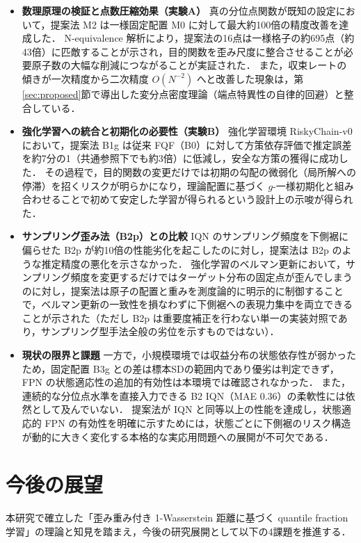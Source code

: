 \documentclass[a4paper,10pt]{jsarticle}
\theoremstyle{definition}
\begin{document}
\begin{itemize}
  \item \textbf{数理原理の検証と点数圧縮効果（実験A）}\quad
  真の分位点関数が既知の設定において，提案法 M2 は一様固定配置 M0 に対して最大約100倍の精度改善を達成した．
  N-equivalence 解析により，提案法の16点は一様格子の約695点（約43倍）に匹敵することが示され，目的関数を歪み尺度に整合させることが必要原子数の大幅な削減につながることが実証された．
  また，収束レートの傾きが一次精度から二次精度 $O(N^{-2})$ へと改善した現象は，第\ref{sec:proposed}節で導出した変分点密度理論（端点特異性の自律的回避）と整合している．

  \item \textbf{強化学習への統合と初期化の必要性（実験B）}\quad
  強化学習環境 RiskyChain-v0 において，提案法 B1g は従来 FQF（B0）に対して方策依存評価で推定誤差を約7分の1（共通参照下でも約3倍）に低減し，安全な方策の獲得に成功した．
  その過程で，目的関数の変更だけでは初期の勾配の微弱化（局所解への停滞）を招くリスクが明らかになり，理論配置に基づく $g$-一様初期化と組み合わせることで初めて安定した学習が得られるという設計上の示唆が得られた．

  \item \textbf{サンプリング歪み法（B2p）との比較}\quad
  IQN のサンプリング頻度を下側裾に偏らせた B2p が約10倍の性能劣化を起こしたのに対し，提案法は B2p のような推定精度の悪化を示さなかった．
  強化学習のベルマン更新において，サンプリング頻度を変更するだけではターゲット分布の固定点が歪んでしまうのに対し，提案法は原子の配置と重みを測度論的に明示的に制御することで，ベルマン更新の一致性を損なわずに下側裾への表現力集中を両立できることが示された（ただし B2p は重要度補正を行わない単一の実装対照であり，サンプリング型手法全般の劣位を示すものではない）．

  \item \textbf{現状の限界と課題}\quad
  一方で，小規模環境では収益分布の状態依存性が弱かったため，固定配置 B3g との差は標本SDの範囲内であり優劣は判定できず，FPN の状態適応性の追加的有効性は本環境では確認されなかった．
  また，連続的な分位点水準を直接入力できる B2 IQN（MAE 0.36）の柔軟性には依然として及んでいない．
  提案法が IQN と同等以上の性能を達成し，状態適応的 FPN の有効性を明確に示すためには，状態ごとに下側裾のリスク構造が動的に大きく変化する本格的な実応用問題への展開が不可欠である．
\end{itemize}

\section{今後の展望}
\label{sec:future}
本研究で確立した「歪み重み付き 1-Wasserstein 距離に基づく quantile fraction 学習」の理論と知見を踏まえ，今後の研究展開として以下の4課題を推進する．
\end{document}
